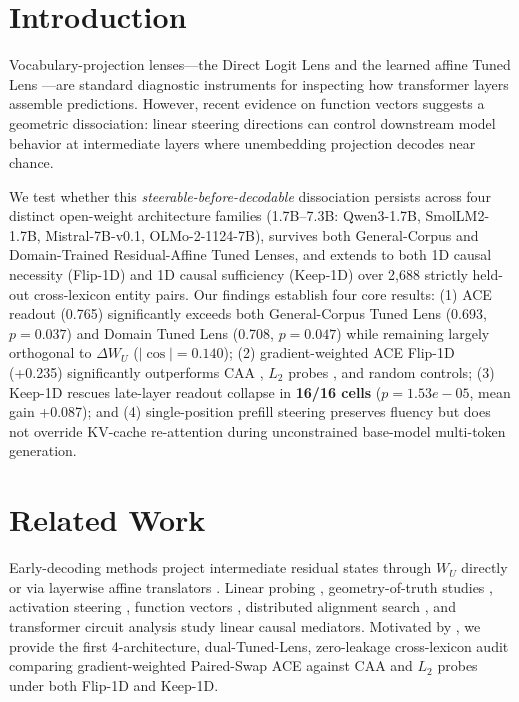 \documentclass[10pt,twocolumn]{article}
\begin{document}
\section{Introduction}
Vocabulary-projection lenses---the Direct Logit Lens \citep{nostalgebraist2020logitlens} and the learned affine Tuned Lens \citep{belrose2023tunedlens}---are standard diagnostic instruments for inspecting how transformer layers assemble predictions. However, recent evidence on function vectors \citep{todd2024function,steerable2026} suggests a geometric dissociation: linear steering directions can control downstream model behavior at intermediate layers where unembedding projection decodes near chance.

We test whether this \emph{steerable-before-decodable} dissociation persists across four distinct open-weight architecture families (1.7B--7.3B: Qwen3-1.7B, SmolLM2-1.7B, Mistral-7B-v0.1, OLMo-2-1124-7B), survives both General-Corpus and Domain-Trained Residual-Affine Tuned Lenses, and extends to both 1D causal necessity (Flip-1D) and 1D causal sufficiency (Keep-1D) over 2,688 strictly held-out cross-lexicon entity pairs. Our findings establish four core results: (1) ACE readout (0.765) significantly exceeds both General-Corpus Tuned Lens (0.693, $p=0.037$) and Domain Tuned Lens (0.708, $p=0.047$) while remaining largely orthogonal to $\Delta W_U$ ($|\cos| = 0.140$); (2) gradient-weighted ACE Flip-1D (+0.235) significantly outperforms CAA \citep{panickssery2024caa}, $L_2$ probes \citep{alain2017probes}, and random controls; (3) Keep-1D rescues late-layer readout collapse in \textbf{16/16 cells} ($p=1.53e-05$, mean gain +0.087); and (4) single-position prefill steering preserves fluency but does not override KV-cache re-attention during unconstrained base-model multi-token generation.

\section{Related Work}
Early-decoding methods project intermediate residual states through $W_U$ directly \citep{nostalgebraist2020logitlens} or via layerwise affine translators \citep{belrose2023tunedlens}. Linear probing \citep{alain2017probes}, geometry-of-truth studies \citep{marks2024truth}, activation steering \citep{turner2023actadd,panickssery2024caa}, function vectors \citep{todd2024function}, distributed alignment search \citep{geiger2024das}, and transformer circuit analysis \citep{elhage2021circuits} study linear causal mediators. Motivated by \citet{steerable2026}, we provide the first 4-architecture, dual-Tuned-Lens, zero-leakage cross-lexicon audit comparing gradient-weighted Paired-Swap ACE against CAA and $L_2$ probes under both Flip-1D and Keep-1D.
\end{document}
